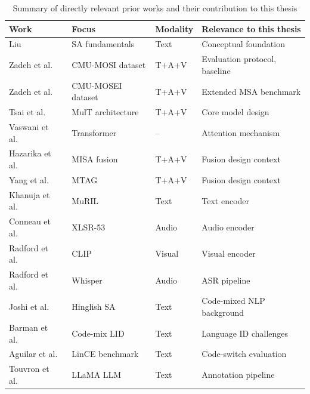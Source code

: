 \begin{table}[ht]
\centering
\caption{Summary of directly relevant prior works and their contribution to this thesis}
\label{tab:litsurvey}
\renewcommand{\arraystretch}{1.3}
\begin{tabular}{p{3.2cm} p{3.0cm} p{2.0cm} p{4.0cm}}
\toprule
\textbf{Work} & \textbf{Focus} & \textbf{Modality} & \textbf{Relevance to this thesis} \\
\midrule
Liu \cite{liu2012sentiment}                & SA fundamentals    & Text    & Conceptual foundation \\
Zadeh et al.\ \cite{zadeh2016mosi}         & CMU-MOSI dataset   & T+A+V   & Evaluation protocol, baseline \\
Zadeh et al.\ \cite{zadeh2018multimodal}   & CMU-MOSEI dataset  & T+A+V   & Extended MSA benchmark \\
Tsai et al.\ \cite{tsai2019multimodal}     & MulT architecture  & T+A+V   & Core model design \\
Vaswani et al.\ \cite{vaswani2017attention}& Transformer        & --      & Attention mechanism \\
Hazarika et al.\ \cite{hazarika2020misa}   & MISA fusion        & T+A+V   & Fusion design context \\
Yang et al.\ \cite{yang2021mtag}           & MTAG               & T+A+V   & Fusion design context \\
Khanuja et al.\ \cite{khanuja2021muril}    & MuRIL              & Text    & Text encoder \\
Conneau et al.\ \cite{conneau2021xlsr}     & XLSR-53            & Audio   & Audio encoder \\
Radford et al.\ \cite{radford2021clip}     & CLIP               & Visual  & Visual encoder \\
Radford et al.\ \cite{radford2023whisper}  & Whisper            & Audio   & ASR pipeline \\
Joshi et al.\ \cite{joshi2016towards}      & Hinglish SA        & Text    & Code-mixed NLP background \\
Barman et al.\ \cite{barman2014code}       & Code-mix LID       & Text    & Language ID challenges \\
Aguilar et al.\ \cite{aguilar2020lince}    & LinCE benchmark    & Text    & Code-switch evaluation \\
Touvron et al.\ \cite{touvron2023llama}    & LLaMA LLM          & Text    & Annotation pipeline \\
\bottomrule
\end{tabular}
\end{table} 

